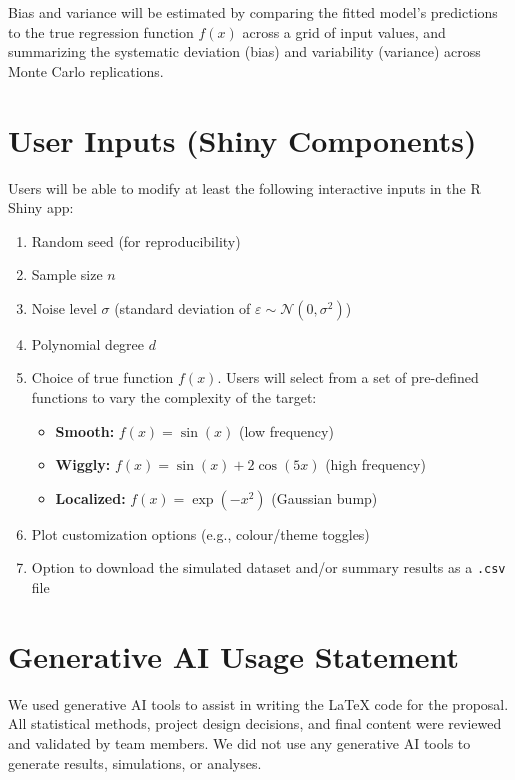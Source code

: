 \documentclass[11pt]{article}
\begin{document}
Bias and variance will be estimated by comparing the fitted model's predictions to the true regression function $f(x)$
across a grid of input values, and summarizing the systematic deviation (bias) and variability (variance) across Monte
Carlo replications.


\section{User Inputs (Shiny Components)}
Users will be able to modify at least the following interactive inputs in the R Shiny app:
\begin{enumerate}
    \item Random seed (for reproducibility)
    \item Sample size $n$
    \item Noise level $\sigma$ (standard deviation of $\varepsilon \sim \mathcal{N}(0, \sigma^2)$)
    \item Polynomial degree $d$
    \item Choice of true function $f(x)$. Users will select from a set of pre-defined functions to vary the complexity of the target:
    \begin{itemize}
        \item \textbf{Smooth:} $f(x) = \sin(x)$ (low frequency)
        \item \textbf{Wiggly:} $f(x) = \sin(x) + 2\cos(5x)$ (high frequency)
        \item \textbf{Localized:} $f(x) = \exp(-x^2)$ (Gaussian bump)
    \end{itemize}
    \item Plot customization options (e.g., colour/theme toggles)
    \item Option to download the simulated dataset and/or summary results as a \texttt{.csv} file
\end{enumerate}



\section{Generative AI Usage Statement}
We used generative AI tools to assist in writing the LaTeX code for the proposal. All statistical methods, project design decisions, and final content were reviewed and validated by team members. We did not use any generative AI tools to generate results, simulations, or analyses.



\nocite{*}

\end{document}
